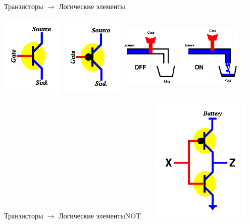 \documentclass[10pt]{beamer}
\begin{document}
\begin{frame}[fragile]{Транзисторы $\rightarrow$ Логические элементы}
\begin{multicols}{2}
\includegraphics[width=3cm, height=4cm]{Term_1/Source/Pirctures/transistor-n.png}
\includegraphics[width=3cm, height=4cm]{Term_1/Source/Pirctures/transistor-p.png}
\includegraphics[width=6cm, height=4cm]{Term_1/Source/Pirctures/transistor-as-faucet.png}
\end{multicols}
\end{frame}

\begin{frame}[fragile]{Транзисторы $\rightarrow$ Логические элементы}{NOT}
\includegraphics[width=6cm, height=6cm]{Term_1/Source/Pirctures/not-circuit.png}
\end{frame}
\end{document}
